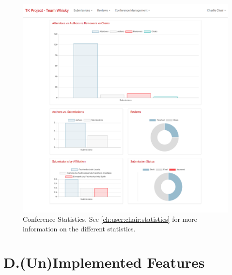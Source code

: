 \documentclass[nochapterpage,nopartpage,noheadingspace,numbersubsubsec,bigchapter,colorback,accentcolor=tud9c,10pt]{tudreport}
\begin{document}
        \begin{figure}[!ht]
            \centering
            \includegraphics[width=\textwidth]{img/ui-statistics}
            \caption{Conference Statistics. See \ref{ch:user:chair:statistics} for more information on the different statistics.}
            \label{fig:appendix:screenshots:ui-statistics}
        \end{figure}

    \clearpage

  \chapter*{D.\quad (Un)Implemented Features}
\end{document}
